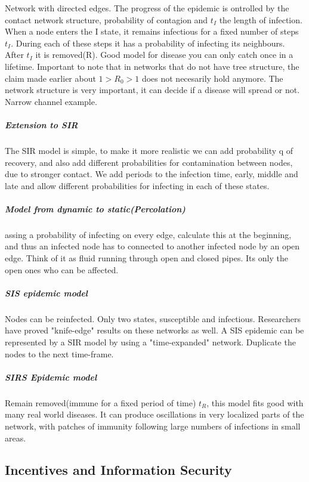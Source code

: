 Network with directed edges. The progress of the epidemic is ontrolled by the contact network
 structure, probability of contagion and $t_{I}$ the length of infection.
When a node enters the I state, it remains infectious for a fixed number of steps $t_{I}$. 
During each of these steps it has a probability of infecting its neighbours. 
After $t_{I}$ it is removed(R). Good model for disease you can only catch once in a lifetime. 
Important to note that in networks that do not have tree structure, the claim made earlier about $1>R_{0}>1$ does not necesarily hold anymore. The network structure is very important, 
it can decide if a disease will spread or not.  Narrow channel example. 
\subparagraph{Extension to SIR}
The SIR model is simple, to make it more realistic we can add probability q of recovery, and also add different probabilities for contamination between nodes, due to stronger contact. We add periods to the infection time, early, middle and late and allow different probabilities for infecting in each of these states. 

\subparagraph{Model from dynamic to static(Percolation)}
assing a probability of infecting on every edge, calculate this at the beginning, and thus an infected
 node has to connected to another infected node by an open edge. Think of it as fluid running through open and closed pipes. Its only the open ones who can be affected. 
 
 \subparagraph{SIS epidemic model}
 Nodes can be reinfected. Only two states, susceptible and infectious. Researchers have proved "knife-edge" results on these networks as well.
 A SIS epidemic can be represented by a SIR model by using a "time-expanded" network. Duplicate the nodes to the next time-frame.
 \subparagraph{SIRS Epidemic model}
 Remain removed(immune for a fixed period of time) $t_{R}$, this model fits good with many real 
 world diseases. It can produce oscillations in  very localized parts of the network, with patches of
  immunity following large numbers of infections in small areas. 

\subsection{Incentives and Information Security}


